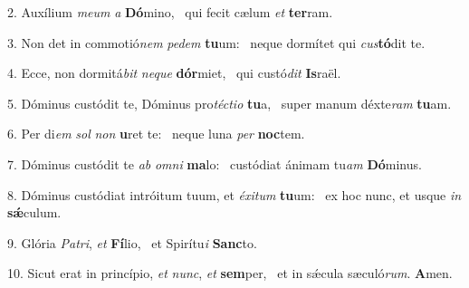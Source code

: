 2. Auxílium \textit{me}\textit{um} \textit{a} \textbf{Dó}mino, \ast\  qui fecit cælum \textit{et} \textbf{ter}ram.\

3. Non det in commotió\textit{nem} \textit{pe}\textit{dem} \textbf{tu}um: \ast\  neque dormítet qui \textit{cus}\textbf{tó}dit te.\

4. Ecce, non dormitá\textit{bit} \textit{ne}\textit{que} \textbf{dór}miet, \ast\  qui custó\textit{dit} \textbf{Is}raël.\

5. Dóminus custódit te, Dóminus pro\textit{téc}\textit{ti}\textit{o} \textbf{tu}a, \ast\  super manum déxte\textit{ram} \textbf{tu}am.\

6. Per di\textit{em} \textit{sol} \textit{non} \textbf{u}ret te: \ast\  neque luna \textit{per} \textbf{noc}tem.\

7. Dóminus custódit te \textit{ab} \textit{om}\textit{ni} \textbf{ma}lo: \ast\  custódiat ánimam tu\textit{am} \textbf{Dó}minus.\

8. Dóminus custódiat intróitum tuum, et \textit{éx}\textit{i}\textit{tum} \textbf{tu}um: \ast\  ex hoc nunc, et usque \textit{in} \textbf{sǽ}culum.\

9. Glória \textit{Pa}\textit{tri}, \textit{et} \textbf{Fí}lio, \ast\  et Spirítu\textit{i} \textbf{Sanc}to.\

10. Sicut erat in princípio, \textit{et} \textit{nunc}, \textit{et} \textbf{sem}per, \ast\  et in sǽcula sæculó\textit{rum}. \textbf{A}men.\

